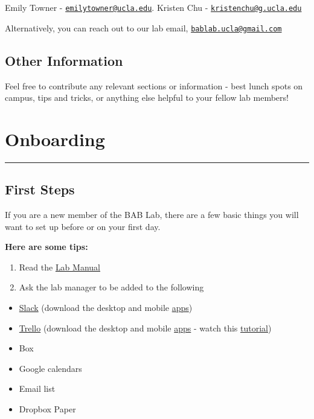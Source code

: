 \documentclass[]{book}
\providecommand{\tightlist}{%
  \setlength{\itemsep}{0pt}\setlength{\parskip}{0pt}}
\begin{document}
Emily Towner - \href{mailto:emilytowner@ucla.edu}{\nolinkurl{emilytowner@ucla.edu}}.
Kristen Chu - \href{mailto:kristenchu@g.ucla.edu}{\nolinkurl{kristenchu@g.ucla.edu}}

Alternatively, you can reach out to our lab email, \href{mailto:bablab.ucla@gmail.com}{\nolinkurl{bablab.ucla@gmail.com}}

\hypertarget{other-information}{%
\section{Other Information}\label{other-information}}

Feel free to contribute any relevant sections or information - best lunch spots on campus, tips and tricks, or anything else helpful to your fellow lab members!

\hypertarget{onboarding}{%
\chapter{Onboarding}\label{onboarding}}

\begin{center}\rule{0.5\linewidth}{\linethickness}\end{center}

\hypertarget{first-steps}{%
\section{First Steps}\label{first-steps}}

If you are a new member of the BAB Lab, there are a few basic things you will want to set up before or on your first day.

\textbf{Here are some tips:}

\begin{enumerate}
\def\labelenumi{\arabic{enumi}.}
\item
  Read the \href{https://bab-lab.github.io/lab_manual/}{Lab Manual}
\item
  Ask the lab manager to be added to the following
\end{enumerate}

\begin{itemize}
\tightlist
\item
  \href{https://slack.com/}{Slack} (download the desktop and mobile \href{https://slack.com/downloads/mac}{apps})
\item
  \href{https://trello.com/emilyanntowner/boards}{Trello} (download the desktop and mobile \href{https://trello.com/en-US/platforms}{apps} - watch this \href{https://www.youtube.com/watch?v=_Ry-SnJygy8\&feature=youtu.be}{tutorial})
\item
  Box
\item
  Google calendars
\item
  Email list
\item
  Dropbox Paper
\end{itemize}
\end{document}
